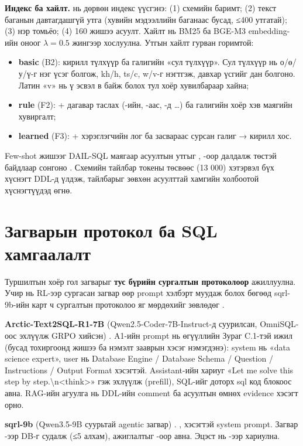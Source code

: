 \textbf{Индекс ба хайлт.}  нь дөрвөн индекс үүсгэнэ:
(1) схемийн баримт;
(2) текст баганын давтагдашгүй утга (хувийн мэдээллийн баганаас бусад, ≤400 утгатай);
(3) нэр томьёо;
(4) 160 жишээ асуулт.
Хайлт нь BM25 ба BGE-M3 embedding-ийн оноог $\lambda = 0.5$ жингээр хослуулна. Утгын хайлт гурван горимтой:
\begin{itemize}
  \item \textbf{basic} (B2): кирилл түлхүүр ба галигийн «сул түлхүүр». Сул түлхүүр нь о/ө/у/ү-г нэг үсэг болгож,
        kh/h, ts/c, w/v-г нэгтгэж, давхар үсгийг дан болгоно. Латин «v» нь ү эсвэл в байж болох тул хоёр хувилбараар хайна;
  \item \textbf{rule} (F2): + дагавар таслах (-ийн, -аас, -д …) ба галигийн хоёр хэв маягийн хувиргалт;
  \item \textbf{learned} (F3): + хэрэглэгчийн лог ба засвараас сурсан галиг → кирилл хос.
\end{itemize}
Few-shot жишээг DAIL-SQL маягаар асуултын утгыг , -оор далдалж төстэй байдлаар сонгоно
\cite{gao_2024_dail_sql}. Схемийн тайлбар токены төсвөөс (13 000) хэтэрвэл бүх хүснэгт DDL-д үлдэж, тайлбарыг зөвхөн
асуулттай хамгийн холбоотой хүснэгтүүдэд өгнө.

\section{Загварын протокол ба SQL хамгаалалт}
\label{sec:protocol}

Туршилтын хоёр гол загварыг \textbf{тус бүрийн сургалтын протоколоор} ажиллуулна. Учир нь RL-ээр сургасан загвар
өөр prompt хэлбэрт муудаж болох бөгөөд sqrl-9b-ийн карт ч сургалтын протоколоо яг мөрдөхийг зөвлөдөг
\cite{feyn_2026_sqrl}.

\textbf{Arctic-Text2SQL-R1-7B} (Qwen2.5-Coder-7B-Instruct-д суурилсан, OmniSQL-оос эхлүүлж GRPO хийсэн)
\cite{yao_2025_arctic_text2sql_r1, snowflake_2025_arctic_card}. A1-ийн prompt нь өгүүллийн Зураг C.1-тэй ижил (бусад
тохиргоонд жишээ ба нэмэлт зааврын хэсэг нэмэгдэнэ): system нь «data science expert», user нь
Database Engine / Database Schema / Question / Instructions / Output Format хэсэгтэй. Assistant-ийн хариуг
«Let me solve this step by step.\textbackslash n<think>» гэж эхлүүлж (prefill), SQL-ийг  доторх
sql код блокоос авна. RAG-ийн агуулга нь DDL-ийн comment ба асуултын өмнөх evidence хэсэгт орно.

\textbf{sqrl-9b} (Qwen3.5-9B суурьтай agentic загвар) \cite{feyn_2026_sqrl}. ,  хэсэгтэй
system prompt. Загвар -ээр DB-г судалж (≤5 алхам), ажиглалтыг -оор
авна. Эцэст нь -ээр хариулна.

